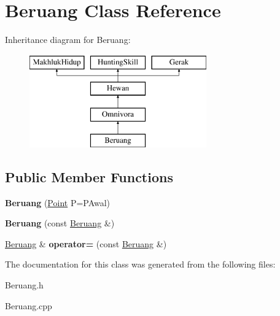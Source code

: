 \hypertarget{class_beruang}{}\section{Beruang Class Reference}
\label{class_beruang}
Inheritance diagram for Beruang\+:\begin{figure}[H]
\begin{center}
\leavevmode
\includegraphics[height=4.000000cm]{class_beruang}
\end{center}
\end{figure}
\subsection*{Public Member Functions}
\begin{DoxyCompactItemize}
\item 
{\bfseries Beruang} (\hyperlink{class_point}{Point} P=P\+Awal)\hypertarget{class_beruang_a4cd45b1d52d8432107c841b03d6837a8}{}\label{class_beruang_a4cd45b1d52d8432107c841b03d6837a8}

\item 
{\bfseries Beruang} (const \hyperlink{class_beruang}{Beruang} \&)\hypertarget{class_beruang_ae9b39f96660feb40b4ef2564a4161f1e}{}\label{class_beruang_ae9b39f96660feb40b4ef2564a4161f1e}

\item 
\hyperlink{class_beruang}{Beruang} \& {\bfseries operator=} (const \hyperlink{class_beruang}{Beruang} \&)\hypertarget{class_beruang_a6b13af41ebe31cd5f63abf56d08459cd}{}\label{class_beruang_a6b13af41ebe31cd5f63abf56d08459cd}

\end{DoxyCompactItemize}


The documentation for this class was generated from the following files\+:\begin{DoxyCompactItemize}
\item 
Beruang.\+h\item 
Beruang.\+cpp\end{DoxyCompactItemize}
